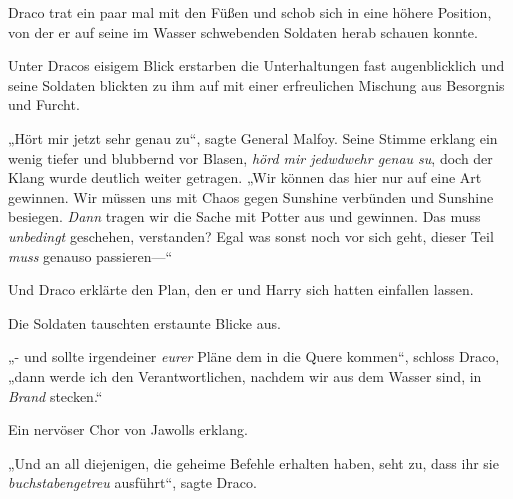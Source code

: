 Draco trat ein paar mal mit den Füßen und schob sich in eine höhere Position, von der er auf seine im Wasser schwebenden Soldaten herab schauen konnte.

Unter Dracos eisigem Blick erstarben die Unterhaltungen fast augenblicklich und seine Soldaten blickten zu ihm auf mit einer erfreulichen Mischung aus Besorgnis und Furcht.

„Hört mir jetzt sehr genau zu“, sagte General Malfoy. Seine Stimme erklang ein wenig tiefer und blubbernd vor Blasen, \emph{hörd mir jedwdwehr genau su}, doch der Klang wurde deutlich weiter getragen. „Wir können das hier nur auf eine Art gewinnen. Wir müssen uns mit Chaos gegen Sunshine verbünden und Sunshine besiegen. \emph{Dann} tragen wir die Sache mit Potter aus und gewinnen. Das muss \emph{unbedingt} geschehen, verstanden? Egal was sonst noch vor sich geht, dieser Teil \emph{muss} genauso passieren—“

Und Draco erklärte den Plan, den er und Harry sich hatten einfallen lassen.

Die Soldaten tauschten erstaunte Blicke aus.

„- und sollte irgendeiner \emph{eurer} Pläne dem in die Quere kommen“, schloss Draco, „dann werde ich den Verantwortlichen, nachdem wir aus dem Wasser sind, in \emph{Brand} stecken.“

Ein nervöser Chor von Jawolls erklang.

„Und an all diejenigen, die geheime Befehle erhalten haben, seht zu, dass ihr sie \emph{buchstabengetreu} ausführt“, sagte Draco.

